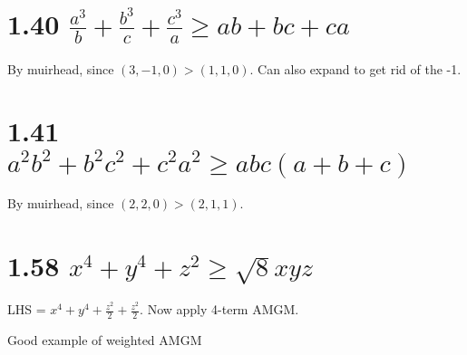 \documentclass{article}
\begin{document}
\section*{1.40 $\frac{a^3}{b} + \frac{b^3}{c} + \frac{c^3}{a} \ge ab + bc + ca$}

By muirhead, since $(3, -1, 0) > (1, 1, 0)$. Can also expand to get rid of the -1.

\section*{1.41 $a^2b^2 + b^2c^2 + c^2a^2 \ge abc(a+b+c)$}

By muirhead, since $(2, 2, 0) > (2, 1, 1)$.

\section*{1.58 $x^4 + y^4 + z^2 \ge \sqrt{8} xyz$}

LHS = $x^4 + y^4 + \frac{z^2}{2} + \frac{z^2}{2}$. Now apply 4-term AMGM.

Good example of weighted AMGM
\end{document}
